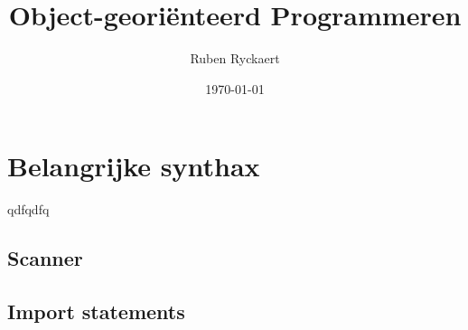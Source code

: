 \documentclass[a4paper,11pt]{article}
\title{Object-georiënteerd Programmeren}
\author{Ruben Ryckaert}
\date{\today}
\begin{document}
\maketitle
\tableofcontents

\section{Belangrijke synthax}

\begin{theorieblok}
qdfqdfq
\end{theorieblok}

\subsection{Scanner}

\subsection{Import statements}







\appendix
\printsymbols
\printformularium
\end{document}
